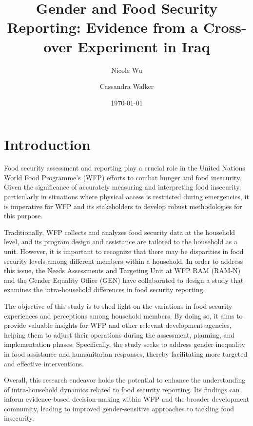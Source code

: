 \documentclass[11pt,harvard]{article}
\author{Nicole Wu  \and Cassandra Walker}
\date{\today}
\title{Gender and Food Security Reporting: Evidence from a Cross-over Experiment in Iraq}
\begin{document}
	\maketitle \vspace{-1cm}
	\onehalfspacing
	\pagebreak
	\setlength{\parskip}{6pt} %
	
\section{Introduction}

Food security assessment and reporting play a crucial role in the United Nations World Food Programme's (WFP) efforts to combat hunger and food insecurity. Given the significance of accurately measuring and interpreting food insecurity, particularly in situations where physical access is restricted during emergencies, it is imperative for WFP and its stakeholders to develop robust methodologies for this purpose.

Traditionally, WFP collects and analyzes food security data at the household level, and its program design and assistance are tailored to the household as a unit. However, it is important to recognize that there may be disparities in food security levels among different members within a household. In order to address this issue, the Needs Assessments and Targeting Unit at WFP RAM (RAM-N) and the Gender Equality Office (GEN) have collaborated to design a study that examines the intra-household differences in food security reporting.

The objective of this study is to shed light on the variations in food security experiences and perceptions among household members. By doing so, it aims to provide valuable insights for WFP and other relevant development agencies, helping them to adjust their operations during the assessment, planning, and implementation phases. Specifically, the study seeks to address gender inequality in food assistance and humanitarian responses, thereby facilitating more targeted and effective interventions.

Overall, this research endeavor holds the potential to enhance the understanding of intra-household dynamics related to food security reporting. Its findings can inform evidence-based decision-making within WFP and the broader development community, leading to improved gender-sensitive approaches to tackling food insecurity.

	\pagebreak
	
\end{document}
